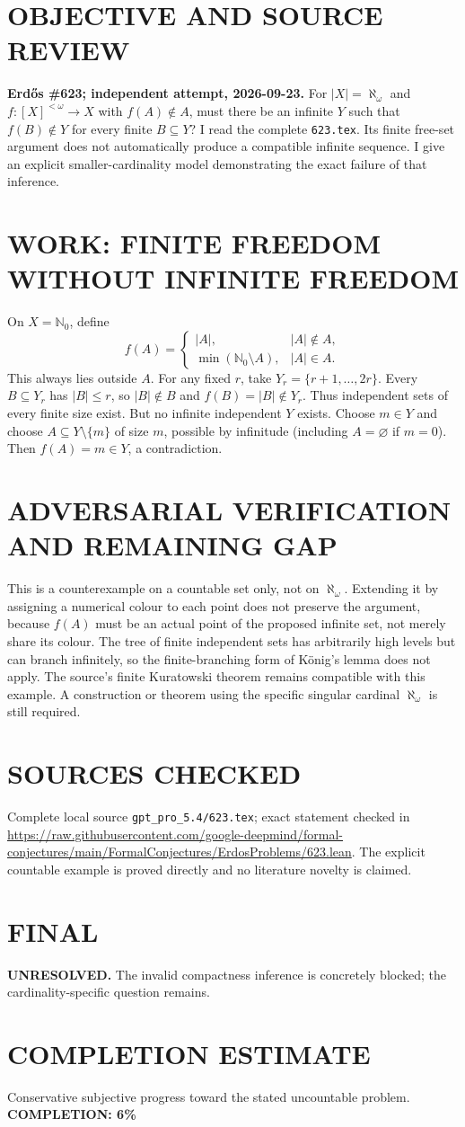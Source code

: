 \section{OBJECTIVE AND SOURCE REVIEW}
\textbf{Erd\H{o}s \#623; independent attempt, 2026-09-23.}
For $|X|=\aleph_\omega$ and $f:[X]^{<\omega}\to X$ with $f(A)\notin A$, must there be an infinite $Y$ such that $f(B)\notin Y$ for every finite $B\subseteq Y$? I read the complete \texttt{623.tex}. Its finite free-set argument does not automatically produce a compatible infinite sequence. I give an explicit smaller-cardinality model demonstrating the exact failure of that inference.
\section{WORK: FINITE FREEDOM WITHOUT INFINITE FREEDOM}
On $X=\mathbb N_0$, define
\[
f(A)=\begin{cases}|A|,&|A|\notin A,\\
\min(\mathbb N_0\setminus A),&|A|\in A.
\end{cases}
\]
This always lies outside $A$. For any fixed $r$, take $Y_r=\{r+1,\ldots,2r\}$. Every $B\subseteq Y_r$ has $|B|\le r$, so $|B|\notin B$ and $f(B)=|B|\notin Y_r$. Thus independent sets of every finite size exist.
But no infinite independent $Y$ exists. Choose $m\in Y$ and choose $A\subseteq Y\setminus\{m\}$ of size $m$, possible by infinitude (including $A=\varnothing$ if $m=0$). Then $f(A)=m\in Y$, a contradiction.
\section{ADVERSARIAL VERIFICATION AND REMAINING GAP}
This is a counterexample on a countable set only, not on $\aleph_\omega$. Extending it by assigning a numerical colour to each point does not preserve the argument, because $f(A)$ must be an actual point of the proposed infinite set, not merely share its colour. The tree of finite independent sets has arbitrarily high levels but can branch infinitely, so the finite-branching form of K\"onig's lemma does not apply. The source's finite Kuratowski theorem remains compatible with this example. A construction or theorem using the specific singular cardinal $\aleph_\omega$ is still required.
\section{SOURCES CHECKED}
Complete local source \texttt{gpt\_pro\_5.4/623.tex}; exact statement checked in \url{https://raw.githubusercontent.com/google-deepmind/formal-conjectures/main/FormalConjectures/ErdosProblems/623.lean}. The explicit countable example is proved directly and no literature novelty is claimed.
\section{FINAL}
\textbf{UNRESOLVED.} The invalid compactness inference is concretely blocked; the cardinality-specific question remains.
\section{COMPLETION ESTIMATE}
Conservative subjective progress toward the stated uncountable problem.
\textbf{COMPLETION: 6\%}
